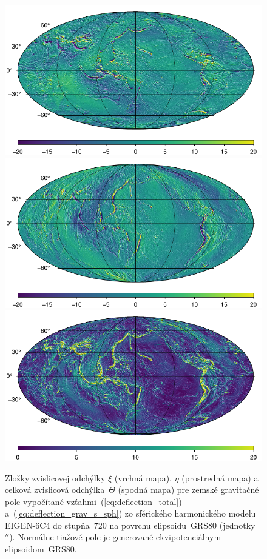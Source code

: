 \documentclass[a4paper, 12pt]{book}
\begin{document}
\begin{figure}
\centering
\includegraphics{./fig-deflections-xi.pdf}
\includegraphics{./fig-deflections-eta.pdf}
\includegraphics{./fig-deflections-theta.pdf}
\caption{Zložky zvislicovej odchýlky $\xi$ (vrchná mapa), $\eta$ (prostredná 
mapa) a celková zvislicová odchýlka~$\Theta$ (spodná mapa) pre zemské 
gravitačné pole vypočítané vzťahmi~(\ref{eq:deflection_total}) 
a~(\ref{eq:deflection_grav_s_sph}) zo sférického harmonického modelu EIGEN-6C4 
do stupňa~720 na povrchu elipsoidu~GRS80 (jednotky~$''$).  Normálne tiažové 
pole je generované ekvipotenciálnym elipsoidom~GRS80.}
\label{fig:deflections_ggm}
\end{figure}
\end{document}
